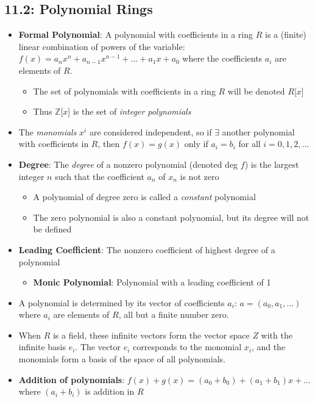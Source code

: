 \documentclass[12pt]{article}
\begin{document}
\subsection*{11.2: Polynomial Rings}
\begin{itemize}
  \item \textbf{Formal Polynomial}: A polynomial with coefficients in a ring $R$ is a (finite) linear combination of powers of the variable: $f(x) = a_nx^n + a_{n-1}x^{n-1} + ... + a_1x + a_0$ where the coefficients $a_i$ are elements of $R$.
  \begin{itemize}
    \item The set of polynomials with coefficients in a ring $R$ will be denoted $R$[$x$]
    \item Thus $\mathbb{Z}$[$x$] is the set of \textit{integer polynomials}
  \end{itemize}
  \item The \textit{monomials} $x^i$ are considered independent, so if $\exists$ another polynomial with coefficients in $R$, then $f(x) = g(x)$ only if $a_i = b_i$ for all $i = 0, 1, 2, ...$
  \item \textbf{Degree}: The \textit{degree} of a nonzero polynomial (denoted deg $f$) is the largest integer $n$ such that the coefficient $a_n$ of $x_n$ is not zero
  \begin{itemize}
    \item A polynomial of degree zero is called a \textit{constant} polynomial
    \item The zero polynomial is also a constant polynomial, but its degree will not be defined
  \end{itemize}
  \item \textbf{Leading Coefficient}: The nonzero coefficient of highest degree of a polynomial
  \begin{itemize}
    \item \textbf{Monic Polynomial}: Polynomial with a leading coefficient of 1
  \end{itemize}
  \item A polynomial is determined by its vector of coefficients $a_i$: $a = (a_0, a_1, ...)$ where $a_i$ are elements of $R$, all but a finite number zero.
  \item When $R$ is a field, these infinite vectors form the vector space $Z$ with the infinite basis $e_i$. The vector $e_i$ corresponds to the monomial $x_i$, and the monomials form a basis of the space of all polynomials.
  \item \textbf{Addition of polynomials}: $f(x) + g(x) = (a_0 + b_0) + (a_1 + b_1)x + ...$ where $(a_i + b_i)$ is addition in $R$

\end{itemize}
\end{document}
